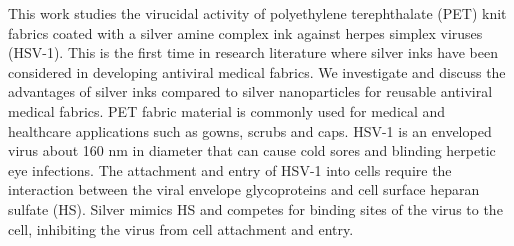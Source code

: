 \documentclass[journal=jacsat,manuscript=article]{achemso}
\begin{document}






This work studies the virucidal activity of
polyethylene terephthalate (PET) knit fabrics coated with a silver amine complex ink \cite{Walker:12}
against herpes simplex viruses (HSV-1). This is the first time in research literature where silver inks have been considered in developing antiviral medical fabrics. We investigate and discuss the advantages of silver inks compared to silver nanoparticles for reusable antiviral medical fabrics. 
PET fabric material is commonly used for medical and healthcare applications such as gowns, scrubs and caps. \cite{Rigby:97} 
HSV-1 is an enveloped virus about 160 nm in diameter that can cause cold sores and blinding herpetic eye infections.\cite{wald:07} 
The attachment and entry of HSV-1 into cells require the interaction between the viral envelope glycoproteins and cell surface heparan sulfate (HS).\cite{baram-pinto_2009} Silver mimics HS and competes for binding sites of the virus to the cell, inhibiting the virus from cell attachment and entry.\cite{baram-pinto_2009,Galdiero:11}
\end{document}
